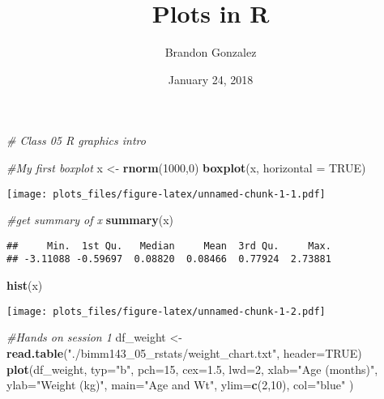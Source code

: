 \documentclass[]{article}
\title{Plots in R}
\author{Brandon Gonzalez}
\date{January 24, 2018}
\newenvironment{Shaded}{\begin{snugshade}}{\end{snugshade}}
\newcommand{\KeywordTok}[1]{\textcolor[rgb]{0.13,0.29,0.53}{\textbf{#1}}}
\newcommand{\DataTypeTok}[1]{\textcolor[rgb]{0.13,0.29,0.53}{#1}}
\newcommand{\DecValTok}[1]{\textcolor[rgb]{0.00,0.00,0.81}{#1}}
\newcommand{\FloatTok}[1]{\textcolor[rgb]{0.00,0.00,0.81}{#1}}
\newcommand{\StringTok}[1]{\textcolor[rgb]{0.31,0.60,0.02}{#1}}
\newcommand{\CommentTok}[1]{\textcolor[rgb]{0.56,0.35,0.01}{\textit{#1}}}
\newcommand{\OtherTok}[1]{\textcolor[rgb]{0.56,0.35,0.01}{#1}}
\newcommand{\NormalTok}[1]{#1}
\begin{document}
\maketitle

\begin{Shaded}
\begin{Highlighting}[]
\CommentTok{# Class 05 R graphics intro }

\CommentTok{#My first boxplot}
\NormalTok{x <-}\StringTok{ }\KeywordTok{rnorm}\NormalTok{(}\DecValTok{1000}\NormalTok{,}\DecValTok{0}\NormalTok{)}
\KeywordTok{boxplot}\NormalTok{(x, }\DataTypeTok{horizontal =} \OtherTok{TRUE}\NormalTok{) }
\end{Highlighting}
\end{Shaded}

\texttt{[image: plots\_files/figure-latex/unnamed-chunk-1-1.pdf]}

\begin{Shaded}
\begin{Highlighting}[]
\CommentTok{#get summary of x}
\KeywordTok{summary}\NormalTok{(x)}
\end{Highlighting}
\end{Shaded}

\begin{verbatim}
##     Min.  1st Qu.   Median     Mean  3rd Qu.     Max. 
## -3.11088 -0.59697  0.08820  0.08466  0.77924  2.73881
\end{verbatim}

\begin{Shaded}
\begin{Highlighting}[]
\KeywordTok{hist}\NormalTok{(x)}
\end{Highlighting}
\end{Shaded}

\texttt{[image: plots\_files/figure-latex/unnamed-chunk-1-2.pdf]}

\begin{Shaded}
\begin{Highlighting}[]
\CommentTok{#Hands on session 1}
\NormalTok{df_weight <-}\StringTok{ }\KeywordTok{read.table}\NormalTok{(}\StringTok{"./bimm143_05_rstats/weight_chart.txt"}\NormalTok{, }\DataTypeTok{header=}\OtherTok{TRUE}\NormalTok{)}
\KeywordTok{plot}\NormalTok{(df_weight, }\DataTypeTok{typ=}\StringTok{"b"}\NormalTok{, }\DataTypeTok{pch=}\DecValTok{15}\NormalTok{, }\DataTypeTok{cex=}\FloatTok{1.5}\NormalTok{, }\DataTypeTok{lwd=}\DecValTok{2}\NormalTok{, }\DataTypeTok{xlab=}\StringTok{"Age (months)"}\NormalTok{, }\DataTypeTok{ylab=}\StringTok{"Weight (kg)"}\NormalTok{, }\DataTypeTok{main=}\StringTok{"Age and Wt"}\NormalTok{, }
     \DataTypeTok{ylim=}\KeywordTok{c}\NormalTok{(}\DecValTok{2}\NormalTok{,}\DecValTok{10}\NormalTok{), }\DataTypeTok{col=}\StringTok{"blue"}\NormalTok{ )}
\end{Highlighting}
\end{Shaded}
\end{document}
